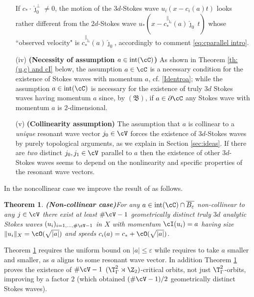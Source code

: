 \documentclass[11pt,a4paper,reqno]{article}
\DeclareMathOperator{\interior}{int}
\numberwithin{equation}{section}
\newtheorem{theorem}{Theorem}[section]
\theoremstyle{definition}
\begin{document}
\begin{itemize}
If  $ c_*\cdot \hat \jmath_0^\bot \neq 0 $, 
the motion of the 
$ 3d$-Stokes wave $ u_i (x- c_i (a) t )$  looks rather different from the  
$ 2d$-Stokes wave $ u_* (x -c_*^{\parallel_{\hat \jmath_0} }(a) \hat \jmath_0 \, t  )$ whose 
``observed velocity" is 
$ c_*^{\parallel_{\hat \jmath_0} }(a) \hat \jmath_0
$, accordingly to  comment
\eqref{eq:cparallel intro}. 
\item[(iv)]   
{\bf (Necessity of assumption $a\in \text{int}(\cC)  $)}
As shown in Theorem \ref{th:(u,c) and cI}  below, the assumption  $a\in \cC$   is a necessary condition for the existence of Stokes waves with momentum  $ a $,  
cf. \eqref{Identroa}; while  the assumption $a\in \interior(\cC)$ is necessary for the existence of 
truly $ 3 d $
Stokes waves having momentum  $ a $ since, by $(\mathfrak{B})$, if $ a \in \partial \cC $  any 
Stokes wave with momentum $ a $ is $ 2 $-dimensional.
\item[(v)]  
{\bf (Collinearity assumption)}
The assumption %
that 
$ a $ is collinear to a {\it unique} resonant wave vector $j_0 \in \cV$ forces the  
existence 
of $3d$-Stokes waves by purely topological  arguments, as we explain in Section \ref{sec:ideas}. 
If there are {\it two} distinct 
$j_0, j_1 \in \cV$ parallel to $ a $ then the 
existence of other $ 3d $-Stokes waves seems to depend on the nonlinearity and specific properties of the resonant wave vectors. %
\end{itemize}


In the noncollinear case we improve the result of \cite{CN} as follows. 

    \begin{theorem}{\bf (Non-collinear case)}\label{th:noncollinear}
            For any $a\in \text{int}(\cC) \cap \overline{B_\varepsilon}$ non-collinear to any $j\in \cV$ there exist at least $ \#\cV-{1} $ 
            geometrically distinct
            truly $3d$ analytic Stokes waves $ (u_i)_{i=1, \ldots, \#\cV-{1} } $ in $X $ with momentum  $\cI (u_i) = a $
            having  size $ \| u_i \|_X = \cO (\sqrt{|a|}) $
         and 
         speeds   
        $ c_i (a)  = c_* + \cO (\sqrt{  |a|}) $.
    \end{theorem}

Theorem \ref{th:noncollinear}  requires the uniform bound on $|a| \leq \varepsilon $ while  \cite{CN} requires  to take $ a $ smaller and smaller,  as  $a$ aligns to some resonant wave vector. In addition 
    Theorem \ref{th:noncollinear} 
    proves the existence of $ \# \cV - 1 $  
    $(\T^2_\Gamma\rtimes \Z_2)$-critical orbits,
    not just $ \T^2_\Gamma $-orbits,   
improving \cite{CN} by a factor $ 2 $ (which obtained 
$ (\#\cV-{1})/2 $ geometrically distinct Stokes waves).  
   
\end{document}
